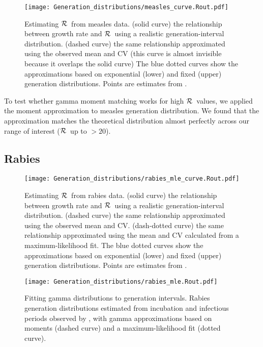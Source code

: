\documentclass[12pt,]{article}
\newcommand{\RR}{\ensuremath{{\cal R}}}
\begin{document}
\begin{figure}[htbp] \centering
	\texttt{[image: Generation\_distributions/measles\_curve.Rout.pdf]}
	\caption{Estimating \RR~from measles data.
		(solid curve) the relationship between growth rate and \RR~using a realistic generation-interval distribution.
		(dashed curve) the same relationship approximated using the observed mean and CV (this curve is almost invisible because it overlaps the solid curve)
		The blue dotted curves show the approximations based on exponential (lower) and fixed (upper) generation distributions.
		Points are estimates from \cite{AndeMay82}.
	}
	\label{fig:measlesCurve}
\end{figure}

To test whether gamma moment matching works for high \RR\ values, we applied the moment approximation to measles generation distribution. We found that the approximation matches the theoretical distribution almost perfectly across our range of interest (\RR\ up to $>20$).

\subsection{Rabies}

\begin{figure}[htbp] \centering
	\texttt{[image: Generation\_distributions/rabies\_mle\_curve.Rout.pdf]}
	\caption{Estimating \RR~from rabies data.
		(solid curve) the relationship between growth rate and \RR~using a realistic generation-interval distribution.
		(dashed curve) the same relationship approximated using the observed mean and CV.
		(dash-dotted curve) the same relationship approximated using the mean and CV calculated from a maximum-likelihood fit.
		The blue dotted curves show the approximations based on exponential (lower) and fixed (upper) generation distributions.
		Points are estimates from \cite{HampDush09}.
	}
	\label{fig:rabiesCurve}
\end{figure}

\begin{figure}[htbp] \centering
	\texttt{[image: Generation\_distributions/rabies\_mle.Rout.pdf]}
	\caption{
		Fitting gamma distributions to generation intervals. 
		Rabies generation distributions estimated from incubation and infectious periods observed by \cite{HampDush09}, with gamma approximations based on moments (dashed curve) and a maximum-likelihood fit (dotted curve).
	}
	\label{fig:rabiesHist}
\end{figure}
\end{document}
